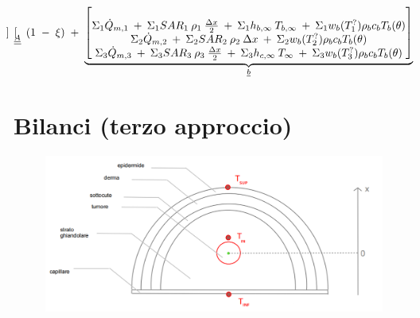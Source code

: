 \begin{landscape}
\begin{center}
{\begin{minipage}{10cm}
\begin{minipage}{1.4\columnwidth}
{\begin{gather*}
{\begin{array}{@{}c@{}}
\begin{bmatrix}
										\end{bmatrix}
									\end{array}									
							}_{\underline{\underline{A}}}
								\; \left( 1 \;-\; \xi \right)
							\;+\;	
							\underbrace{								
									\begin{bmatrix}
										\phantom{   }\\
										\Sigma_1 \Dot{Q}_{m,1} \:+\: \Sigma_1 SAR_1 \: \rho_1 \: \frac{\Delta x}{2} \:+\: \Sigma_1 h_{b, \infty} \: T_{b, \infty} \:+\: \Sigma_1  w_b (T_1^?) \rho _b c_b T_b(\theta) \\
										\Sigma_2 \Dot{Q}_{m,2} \:+\: \Sigma_2 SAR_2 \: \rho_2 \: \Delta x \:+\:  \Sigma_2 w_b (T_2^?) \rho _b c_b T_b(\theta) \\
										\Sigma_3 \Dot{Q}_{m,3} \:+\: \Sigma_3 SAR_3 \: \rho_3 \: \frac{\Delta x}{2} \:+\: \Sigma_3 h_{c, \infty} \: T_{\infty} \:+\:  \Sigma_3 w_b (T_3^?) \rho _b c_b T_b(\theta) 
									\end{bmatrix}									
							}_{\underline{b}}
					\end{gather*}}
					\end{minipage}
				
			\end{minipage}}
		\end{center}
\end{landscape}


\newpage




\section*{\hspace{2cm} Bilanci (terzo approccio)}

\begin{figure}[H]
	\centering
	\includegraphics[width=.8\textwidth]{Immagini/sistema_3Nodi.png} 
	\label{sistema3Nodi}
\end{figure}

